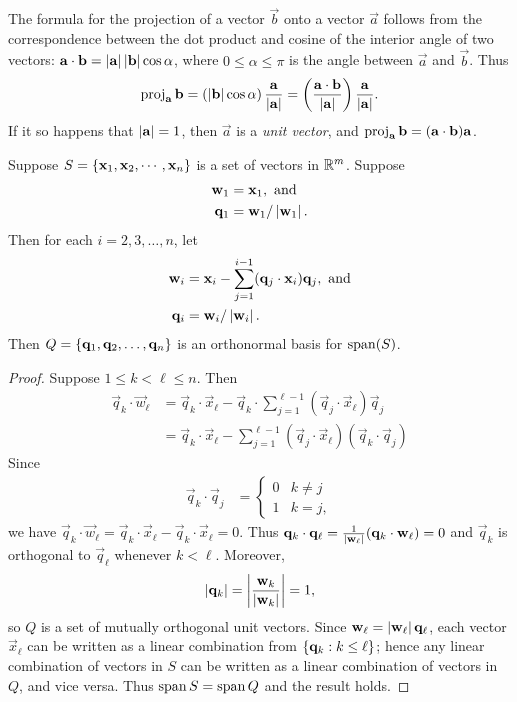 \documentclass[m3380-lec-main.tex]{subfiles}
\begin{document}
The formula for the projection of a vector $\vec{b}$ onto a vector $\vec{a}$ follows from the correspondence between the dot product and cosine of the interior angle of two vectors: $\mathbf{a}\cdot\mathbf{b} = \left|\mathbf{a}\right|\left|\mathbf{b}\right|\cos\alpha$, where $0\leq \alpha\leq \pi$ is the angle between $\vec{a}$ and $\vec{b}$. Thus
\[\operatorname{proj}_{\mathbf{a}}\mathbf{b} 
	= \left(\left|\mathbf{b}\right|\cos\alpha\right)\frac{\mathbf{a}}{\left|\mathbf{a}\right|}
	= \left(\frac{\mathbf{a}\cdot\mathbf{b}}{\mathbf{\left|a\right|}}\right)\frac{\mathbf{a}}{\left|\mathbf{a}\right|}.\]
If it so happens that $\left|\mathbf{a}\right|=1$, then $\vec{a}$ is a \emph{unit vector}, and $\operatorname{proj}_{\mathbf{a}}\mathbf{b} = (\mathbf{a}\cdot\mathbf{b})\mathbf{a}$.
\begin{thm} Suppose $S=\left\{\mathbf{x}_1,\mathbf{x}_2,\cdots,\mathbf{x}_n\right\}$ is a set of vectors in $\mathbb{R}^m$. Suppose
\begin{align*}
\mathbf{w}_1 &= \mathbf{x}_1,\text{ and} \\
\mathbf{q}_1 &= \mathbf{w}_1/\left|\mathbf{w}_1\right|.
\end{align*}
Then for each $i=2,3,\ldots,n$, let
\begin{align*}
\mathbf{w}_i &= \mathbf{x}_i-\sum_{j=1}^{i-1} (\mathbf{q}_j\cdot\mathbf{x}_i)\mathbf{q}_j,\text{ and}\\
\mathbf{q}_i &= \mathbf{w}_i/\left|\mathbf{w}_i\right|.
\end{align*}
Then $Q=\left\{\mathbf{q}_1,\mathbf{q}_2,\ldots,\mathbf{q}_n\right\}$ is an orthonormal basis for $\operatorname{span}(S)$.
\end{thm}
\begin{proof}
Suppose $1\leq k<\ell\leq n$. Then 
\begin{align*}
\vec{q}_k\cdot\vec{w}_{\ell} &= \vec{q}_k\cdot\vec{x}_{\ell} - \vec{q}_k\cdot\sum_{j=1}^{\ell-1} (\vec{q}_j\cdot\vec{x}_\ell)\vec{q}_j \\
&= \vec{q}_k\cdot\vec{x}_{\ell} - \sum_{j=1}^{\ell-1}(\vec{q}_j\cdot \vec{x}_\ell)(\vec{q}_k\cdot\vec{q}_j)
\end{align*}
Since
\begin{align*}
\vec{q}_k\cdot\vec{q}_j &= \begin{cases} 0&k\neq j\\1&k=j,\end{cases}
\end{align*}
we have $\vec{q}_k\cdot\vec{w}_\ell = \vec{q}_k\cdot\vec{x}_\ell - \vec{q}_k\cdot\vec{x}_\ell = 0$. Thus $\mathbf{q}_k\cdot\mathbf{q}_\ell = \frac1{\left|\mathbf{w}_\ell\right|}(\mathbf{q}_k\cdot\mathbf{w}_\ell) = 0$ and $\vec{q}_k$ is orthogonal to $\vec{q}_{\ell}$ whenever $k<\ell$. Moreover, 
\[\left|\mathbf{q}_k\right| = \left|\frac{\mathbf{w}_k}{\left|\mathbf{w}_k\right|}\right| = 1,\]
so $Q$ is a set of mutually orthogonal unit vectors. Since $\mathbf{w}_\ell=\left|\mathbf{w}_\ell\right|\mathbf{q}_\ell$, each vector $\vec{x}_\ell$ can be written as a linear combination from $\left\{\mathbf{q}_k:k\leq\ell\right\}$; hence any linear combination of vectors in $S$ can be written as a linear combination of vectors in $Q$, and vice versa. Thus $\operatorname{span} S=\operatorname{span} Q$ and the result holds. 
\end{proof}
\end{document}
